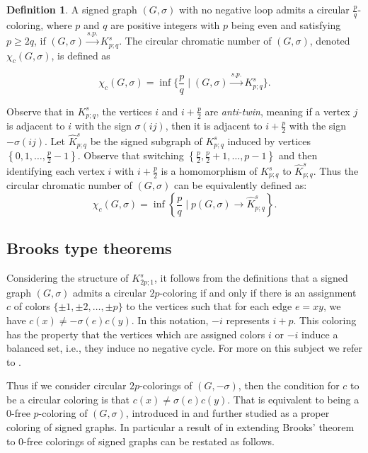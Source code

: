 \documentclass[11pt,a4paper]{article}
\theoremstyle{definition}
\newtheorem{definition}[theorem]{Definition}
\begin{document}
	
	\begin{definition}
		A signed graph $(G, \sigma)$ with no negative loop admits a circular $\frac{p}{q}$-coloring, where $p$ and $q$ are positive integers with $p$ being even and satisfying $p\geq 2q$, if  $(G, \sigma) \xrightarrow{s . p .} K_{p ; q}^s$. The circular chromatic number of $(G, \sigma)$, denoted $\chi_c(G, \sigma)$, is defined as  
		
		$$
		\chi_c(G, \sigma)=\inf \{\frac{p}{q} \mid (G, \sigma) \xrightarrow{s . p .} K_{p ; q}^s\}.
		$$
	\end{definition}
	
	Observe that in $K_{p ; q}^s$, the vertices $i$ and $i+\frac{p}{2}$ are \emph{anti-twin}, meaning if a vertex $j$ is adjacent to $i$ with the sign $\sigma(ij)$, then it is adjacent to $i+\frac{p}{2}$ with the sign $-\sigma(ij)$. Let $\widehat{K}_{p ; q}^s$ be the signed subgraph of $K_{p ; q}^s$ induced by vertices $\left\{0,1, \ldots, \frac{p}{2}-1\right\}$. Observe that switching $\left\{\frac{p}{2}, \frac{p}{2}+1, \ldots, p-1\right\}$ and then identifying each vertex $i$ with $i+\frac{p}{2}$ is a homomorphism of $K_{p ; q}^s$ to $\widehat{K}_{p ; q}^s$. Thus the circular chromatic number of $(G, \sigma)$ can be equivalently defined as: 
	$$
	\chi_c(G, \sigma)=\inf \left\{\frac{p}{q} \mid p (G, \sigma) \rightarrow \widehat{K}_{p ; q}^s\right\}. 
	$$
	
	\subsection{Brooks type theorems}
	Considering the structure of $K_{2p ; 1}^s$, it follows from the definitions that a signed graph $(G,\sigma)$ admits a circular $2p$-coloring if and only if there is an assignment $c$ of colors $\{\pm 1, \pm 2, \ldots, \pm p\}$ to the vertices such that for each edge $e=xy$, we have $c(x)\neq - \sigma(e)c(y)$. In this notation, $-i$ represents $i+p$. This coloring has the property that the vertices which are assigned colors $i$ or $-i$ induce a balanced set, i.e., they induce no negative cycle. For more on this subject we refer to \cite{JMNNQ25}.  
	
	Thus if we consider circular $2p$-colorings of $(G, -\sigma)$, then the condition for $c$ to be a circular coloring is that $c(x)\neq \sigma(e)c(y)$.  That is equivalent to being a 0-free $p$-coloring of $(G, \sigma)$, introduced in \cite{zaslavsky82} and further studied as a proper coloring of signed graphs. In particular a result of \cite{MRS16} in extending Brooks' theorem to 0-free colorings of signed graphs can be restated as follows. 
	
\end{document}
